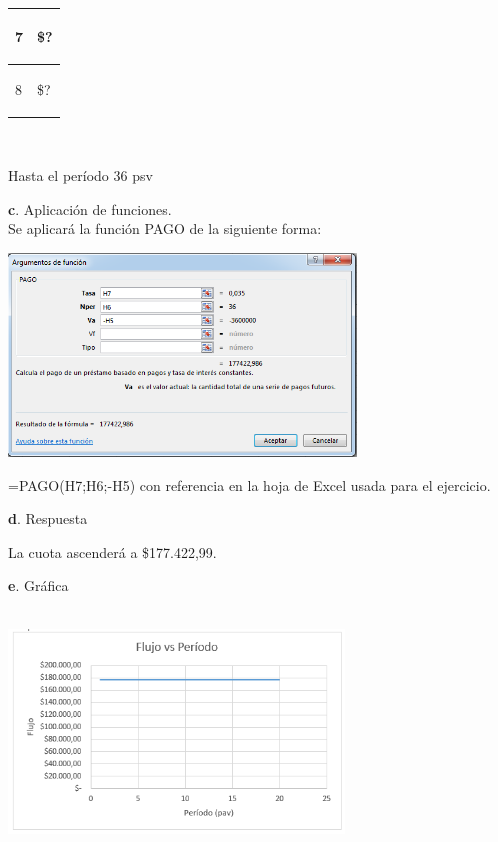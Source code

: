 \begin{spacing}{0.1}
\begin{center}
\begin{tabular}{ |p{3.5cm}| p{3cm}|}
\begin{center}7 \end{center}    & \begin{center} \$? \end{center}  \\ \hline
\begin{center}8 \end{center}    & \begin{center} \$? \end{center} \\ \hline
\end{tabular}
\end{center}
\end{spacing}
\\
\begin{center}Hasta el período 36 psv \end{center}

\textbf{c}. Aplicación de funciones.
 \\
 
Se aplicará la función PAGO de la siguiente forma:     
 
 \begin{center}
	\includegraphics[height=5.4cm]{img/ch8/8_10.png}
\end{center}

=PAGO(H7;H6;-H5) con referencia en la hoja de Excel usada para el ejercicio.

\vspace{2mm}

\textbf{d}. Respuesta

\vspace{2mm}
La cuota ascenderá a  \$177.422,99.

\vspace{2mm}

\clearpage

\textbf{e}. Gráfica\\
\ \begin{center}
	\includegraphics[height=5.4cm]{img/ch8/8_11.png}
\end{center}

